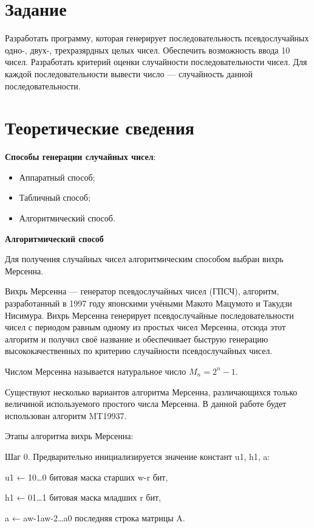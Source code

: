 \section*{Задание}

Разработать программу, которая генерирует последовательность псевдослучайных одно-, двух-, трехразярдных целых чисел. Обеспечить возможность ввода 10 чисел.
Разработать критерий оценки случайности последовательности чисел. Для каждой последовательности вывести число --- случайность данной последовательности.


\section*{Теоретические сведения}

\textbf{Способы генерации случайных чисел}:
\begin{itemize}
    \item Аппаратный способ;
    \item Табличный способ;
    \item Алгоритмический способ.
\end{itemize}


\textbf{Алгоритмический способ}

Для получения случайных чисел алгоритмическим способом выбран вихрь Мерсенна.

Вихрь Мерсенна --- генератор псевдослучайных чисел (ГПСЧ), алгоритм, разработанный в 1997 году японскими учёными Макото Мацумото и Такудзи Нисимура. Вихрь Мерсенна генерирует псевдослучайные последовательности чисел с периодом равным одному из простых чисел Мерсенна, отсюда этот алгоритм и получил своё название и обеспечивает быструю генерацию высококачественных по критерию случайности псевдослучайных чисел. 

Числом Мерсенна называется натуральное число $M_n = 2^n - 1$.

Существуют несколько вариантов алгоритма Мерсенна, различающихся только величиной используемого простого числа Мерсенна. В данной работе будет использован алгоритм MT19937. 

Этапы алгоритма вихрь Мерсенна: 

Шаг 0. Предварительно инициализируется значение констант u1, h1, a:

  u1 ← 10…0   битовая маска старших w-r бит,
  
  h1 ← 01…1   битовая маска младших r бит,
  
  a ← aw-1aw-2…a0  последняя строка матрицы A.

